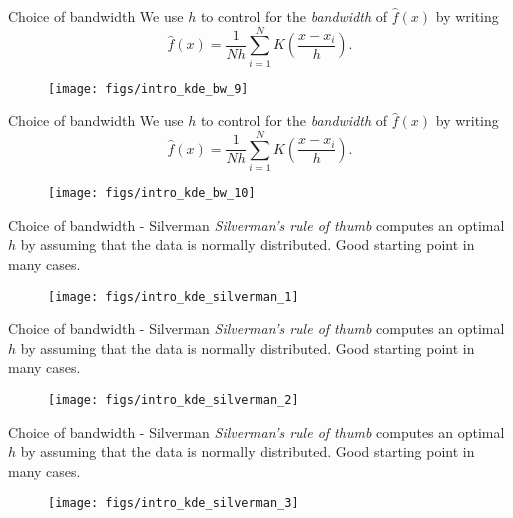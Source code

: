 \documentclass[11pt, aspectratio=149]{beamer}
\theoremstyle{plain}
\begin{document}
\begin{frame}[fragile, t]{Choice of bandwidth}
	We use $h$ to control for the \emph{bandwidth} of $\hat{f}(x)$ by writing
	\begin{equation*}
	\hat{f}(x) = \frac{1}{Nh} \sum_{i=1}^{N} K\left(\frac{x - x_i}{h}\right).
	\end{equation*}
	\vfill
	\begin{figure}
		\centering
		\texttt{[image: figs/intro\_kde\_bw\_9]}
	\end{figure}
\end{frame}


\begin{frame}[fragile, t]{Choice of bandwidth}
	We use $h$ to control for the \emph{bandwidth} of $\hat{f}(x)$ by writing
	\begin{equation*}
	\hat{f}(x) = \frac{1}{Nh} \sum_{i=1}^{N} K\left(\frac{x - x_i}{h}\right).
	\end{equation*}
	\vfill
	\begin{figure}
		\centering
		\texttt{[image: figs/intro\_kde\_bw\_10]}
	\end{figure}
\end{frame}





\begin{frame}[fragile, t]{Choice of bandwidth - Silverman}
	\emph{Silverman's rule of thumb} computes an optimal $h$ by assuming that the data is normally distributed. Good starting point in many cases.
	\vfill
	\begin{figure}
		\centering
		\texttt{[image: figs/intro\_kde\_silverman\_1]}
	\end{figure}
\end{frame}

\begin{frame}[fragile, t]{Choice of bandwidth - Silverman}
	\emph{Silverman's rule of thumb} computes an optimal $h$ by assuming that the data is normally distributed. Good starting point in many cases.
	\vfill
	\begin{figure}
		\centering
		\texttt{[image: figs/intro\_kde\_silverman\_2]}
	\end{figure}
\end{frame}

\begin{frame}[fragile, t]{Choice of bandwidth - Silverman}
	\emph{Silverman's rule of thumb} computes an optimal $h$ by assuming that the data is normally distributed. Good starting point in many cases.
	\vfill
	\begin{figure}
		\centering
		\texttt{[image: figs/intro\_kde\_silverman\_3]}
	\end{figure}
\end{frame}
\end{document}
